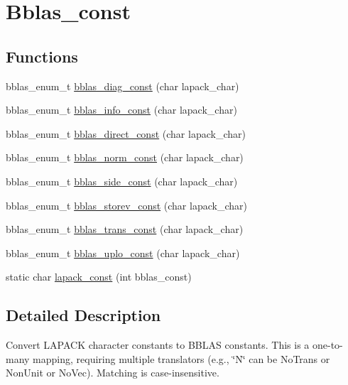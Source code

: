 \hypertarget{group__bblas__const}{}\section{Bblas\+\_\+const}
\label{group__bblas__const}
\subsection*{Functions}
\begin{DoxyCompactItemize}
\item 
bblas\+\_\+enum\+\_\+t \hyperlink{group__bblas__const_ga6169647caea1bc4ab77bcf161db8019e}{bblas\+\_\+diag\+\_\+const} (char lapack\+\_\+char)
\item 
bblas\+\_\+enum\+\_\+t \hyperlink{group__bblas__const_gafdc80d2f9b5d3eb302d64147f1c44aa7}{bblas\+\_\+info\+\_\+const} (char lapack\+\_\+char)
\item 
bblas\+\_\+enum\+\_\+t \hyperlink{group__bblas__const_ga5ba578faa6c2dcc4a37e09f1d7aefe7c}{bblas\+\_\+direct\+\_\+const} (char lapack\+\_\+char)
\item 
bblas\+\_\+enum\+\_\+t \hyperlink{group__bblas__const_gac004937c6fbbfee293aa7681e3927fe3}{bblas\+\_\+norm\+\_\+const} (char lapack\+\_\+char)
\item 
bblas\+\_\+enum\+\_\+t \hyperlink{group__bblas__const_ga56e829b323f9ef83d896d4755283039a}{bblas\+\_\+side\+\_\+const} (char lapack\+\_\+char)
\item 
bblas\+\_\+enum\+\_\+t \hyperlink{group__bblas__const_gae9bb1f3a88f105d76062888fea78d4da}{bblas\+\_\+storev\+\_\+const} (char lapack\+\_\+char)
\item 
bblas\+\_\+enum\+\_\+t \hyperlink{group__bblas__const_ga2bd4e89d6fbd7df92e8836e862e96e2a}{bblas\+\_\+trans\+\_\+const} (char lapack\+\_\+char)
\item 
bblas\+\_\+enum\+\_\+t \hyperlink{group__bblas__const_gacc2bf7245fa316e6cbf888a61aa1f1bc}{bblas\+\_\+uplo\+\_\+const} (char lapack\+\_\+char)
\item 
static char \hyperlink{group__bblas__const_gab2e4ef289e7eee71dd23c6d4b817a6a2}{lapack\+\_\+const} (int bblas\+\_\+const)
\end{DoxyCompactItemize}


\subsection{Detailed Description}
Convert L\+A\+P\+A\+CK character constants to B\+B\+L\+AS constants. This is a one-\/to-\/many mapping, requiring multiple translators (e.\+g., \char`\"{}\+N\char`\"{} can be No\+Trans or Non\+Unit or No\+Vec). Matching is case-\/insensitive. 


